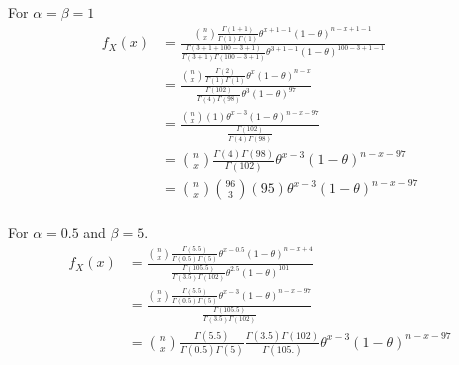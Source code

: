 \documentclass{tufte-book}
\theoremstyle{mytheoremstyle}
\theoremstyle{mylemstyle}
\theoremstyle{mydefstyle}
\begin{document}
\begin{enumerate}
For $\alpha=\beta=1$
\begin{align*}
f_X(x)&= \frac{\binom{n}{x} \frac{\Gamma(1+1)}{\Gamma(1)\Gamma(1)}\theta^{x+1-1}(1-\theta)^{n-x+1-1}}{ \frac{\Gamma(3+1+100-3+1)}{\Gamma(3+1)\Gamma(100-3+1)}\theta^{3+1-1}(1-\theta)^{100-3+1-1}}\\
&=\frac{\binom{n}{x} \frac{\Gamma(2)}{\Gamma(1)\Gamma(1)}\theta^{x}(1-\theta)^{n-x}}{ \frac{\Gamma(102)}{\Gamma(4)\Gamma(98)}\theta^{3}(1-\theta)^{97}}\\
&=\frac{\binom{n}{x}(1)\theta^{x-3}(1-\theta)^{n-x-97}}{ \frac{\Gamma(102)}{\Gamma(4)\Gamma(98)}}\\
&= \binom{n}{x}\frac{\Gamma(4)\Gamma(98)}{\Gamma(102)}\theta^{x-3}(1-\theta)^{n-x-97}\\
&=\binom{n}{x}\binom{96}{3}(95)\theta^{x-3}(1-\theta)^{n-x-97}\\
\end{align*}

For $\alpha=0.5$ and $\beta=5$.
\begin{align*}
f_X(x) &= \frac{\binom{n}{x} \frac{\Gamma(5.5)}{\Gamma(0.5)\Gamma(5)}\theta^{x-0.5}(1-\theta)^{n-x+4}}{ \frac{\Gamma(105.5)}{\Gamma(3.5)\Gamma(102)}\theta^{2.5}(1-\theta)^{101}}\\
 &= \frac{\binom{n}{x} \frac{\Gamma(5.5)}{\Gamma(0.5)\Gamma(5)}\theta^{x-3}(1-\theta)^{n-x-97}}{ \frac{\Gamma(105.5)}{\Gamma(3.5)\Gamma(102)}}\\
&=\binom{n}{x}\frac{\Gamma(5.5)}{\Gamma(0.5)\Gamma(5)}\frac{\Gamma(3.5)\Gamma(102)}{\Gamma(105.)}\theta^{x-3}(1-\theta)^{n-x-97}\\
\end{align*}
\end{enumerate}
\end{document}
